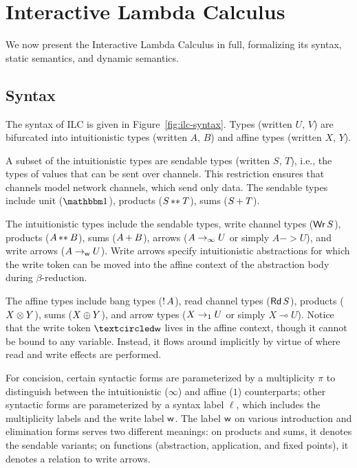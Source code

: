 
%



\section{Interactive Lambda Calculus}
\label{sec:ilc}

We now present the Interactive Lambda Calculus in full, formalizing its syntax,
static semantics, and dynamic semantics.

\subsection{Syntax}
\label{subsec:syntax}

The syntax of ILC is given in Figure~\ref{fig:ilc-syntax}. Types (written $U$,
$V$) are bifurcated into intuitionistic types (written $A$, $B$) and affine
types (written $X$, $Y$).

A subset of the intuitionistic types are sendable types (written $S$, $T$),
i.e., the types of values that can be sent over channels. This restriction
ensures that channels model network channels, which send only data. The sendable
types include unit ($\tyUnit$), products (${S}\, {**}_{}\, {T}$), sums
(${S}\, {+}_{}\, {T}$).

The intuitionistic types include the sendable types, write channel types
($\textnormal{\textsf{Wr}}\,S$), products (${A}\, {**}_{}\, {B}$), sums (${A}\, {+}_{}\, {B}$), arrows
(${A}\rightarrow_{\infty}{U}$ or simply $A -> U$), and write arrows
(${A}\rightarrow_{\textsf{w}}{U}$). Write arrows specify intuitionistic abstractions for
which the write token can be moved into the affine context of the abstraction
body during $\beta$-reduction.

The affine types include bang types (${!}\,{A}$), read channel types
($\textnormal{\textsf{Rd}}\,S$), products (${X}\otimes{Y}$), sums (${X}\oplus{Y}$), and arrow
types (${X}\rightarrow_{1}{U}$ or simply $X \multimap U$). Notice that the write token
$\wrtok$ lives in the affine context, though it cannot be bound to any
variable. Instead, it flows around implicitly by virtue of where read and write
effects are performed.

For concision, certain syntactic forms are parameterized by a multiplicity $\pi$
to distinguish between the intuitionistic ($\infty$) and affine ($1$) counterparts;
other syntactic forms are parameterized by a syntax label $\ell$, which includes
the multiplicity labels and the write label $\textsf{w}$. The label $\textsf{w}$ on various
introduction and elimination forms serves two different meanings: on products
and sums, it denotes the sendable variants; on functions (abstraction,
application, and fixed points), it denotes a relation to write arrows.

